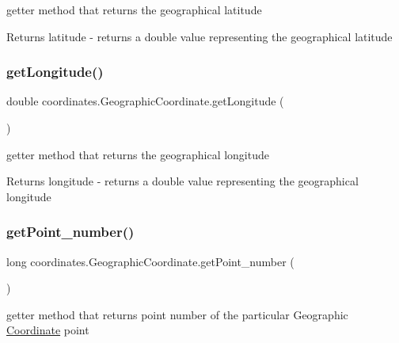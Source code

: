getter method that returns the geographical latitude 

\begin{DoxyReturn}{Returns}
latitude -\/ returns a double value representing the geographical latitude 
\end{DoxyReturn}
\mbox{\label{classcoordinates_1_1_geographic_coordinate_a1f6aea00058a08a23191930436cb5ef7}} 
\subsubsection{\texorpdfstring{get\+Longitude()}{getLongitude()}}
{\footnotesize\ttfamily double coordinates.\+Geographic\+Coordinate.\+get\+Longitude (\begin{DoxyParamCaption}{ }\end{DoxyParamCaption})}



getter method that returns the geographical longitude 

\begin{DoxyReturn}{Returns}
longitude -\/ returns a double value representing the geographical longitude 
\end{DoxyReturn}
\mbox{\label{classcoordinates_1_1_geographic_coordinate_a68208a97e0db4620dce1163bafdcab06}} 
\subsubsection{\texorpdfstring{get\+Point\+\_\+number()}{getPoint\_number()}}
{\footnotesize\ttfamily long coordinates.\+Geographic\+Coordinate.\+get\+Point\+\_\+number (\begin{DoxyParamCaption}{ }\end{DoxyParamCaption})}



getter method that returns point number of the particular Geographic \hyperlink{classcoordinates_1_1_coordinate}{Coordinate} point 

